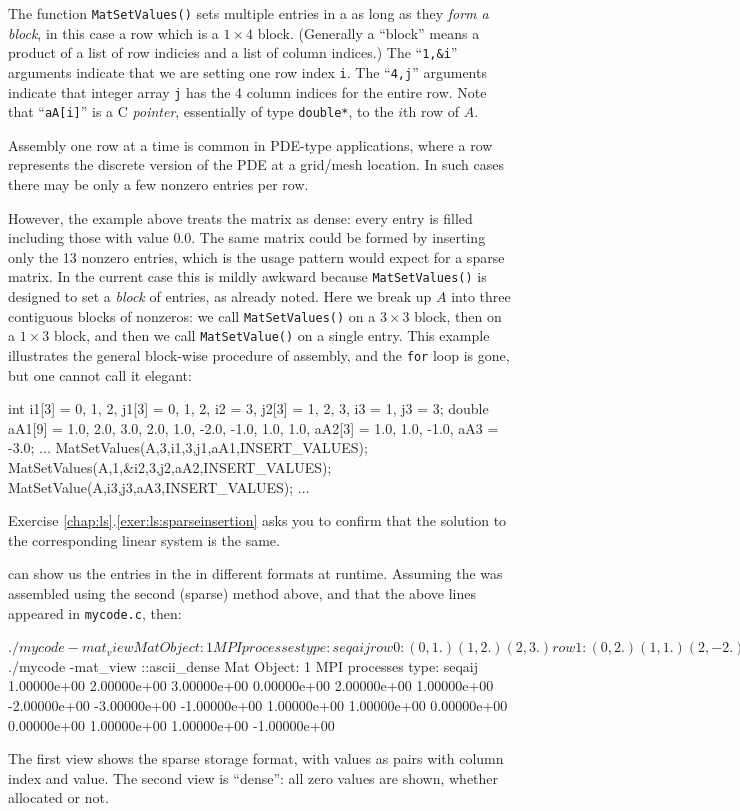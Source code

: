 The function \texttt{MatSetValues()} sets multiple entries in a \pMat as long as they \emph{form a block}, in this case a row which is a $1\times 4$ block.  (Generally a ``block'' means a product of a list of row indicies and a list of column indices.)  The ``\texttt{1,\&i}'' arguments indicate that we are setting one row index \texttt{i}.  The ``\texttt{4,j}'' arguments indicate that integer array \texttt{j} has the 4 column indices for the entire row.  Note that ``\texttt{aA[i]}'' is a C \emph{pointer}, essentially of type \texttt{double*}, to the $i$th row of $A$.

Assembly one row at a time is common in PDE-type applications, where a row represents the discrete version of the PDE at a grid/mesh location.  In such cases there may be only a few nonzero entries per row.

However, the example above treats the matrix as dense: every entry is filled including those with value $0.0$.  The same matrix could be formed by inserting only the 13 nonzero entries, which is the usage pattern would expect for a sparse matrix.  In the current case this is mildly awkward because \texttt{MatSetValues()} is designed to set a \emph{block} of entries, as already noted.  Here we break up $A$ into three contiguous blocks of nonzeros: we call \texttt{MatSetValues()} on a $3\times 3$ block, then on a $1\times 3$ block, and then we call \texttt{MatSetValue()} on a single entry.  This example illustrates the general block-wise procedure of assembly, and the \texttt{for} loop is gone, but one cannot call it elegant:
\begin{code}
int    i1[3] = {0, 1, 2},
       j1[3] = {0, 1, 2},
       i2 = 3,
       j2[3] = {1, 2, 3},
       i3 = 1,
       j3 = 3;
double aA1[9] = { 1.0,  2.0,  3.0,
                  2.0,  1.0, -2.0,
                 -1.0,  1.0,  1.0},
       aA2[3] = { 1.0,  1.0, -1.0},
       aA3 = -3.0;
...
MatSetValues(A,3,i1,3,j1,aA1,INSERT_VALUES);
MatSetValues(A,1,&i2,3,j2,aA2,INSERT_VALUES);
MatSetValue(A,i3,j3,aA3,INSERT_VALUES);
...
\end{code}
Exercise \ref{chap:ls}.\ref{exer:ls:sparseinsertion} asks you to confirm that the solution to the corresponding linear system is the same.  \label{page:ls:sparseinsertion}

\PETSc can show us the entries in the \pMat in different formats at runtime.  Assuming the \pMat was assembled using the second (sparse) method above, and that the above lines appeared in \texttt{mycode.c}, then:
\begin{cline}
$ ./mycode -mat_view
Mat Object: 1 MPI processes
  type: seqaij
row 0: (0, 1.)  (1, 2.)  (2, 3.) 
row 1: (0, 2.)  (1, 1.)  (2, -2.)  (3, -3.) 
row 2: (0, -1.)  (1, 1.)  (2, 1.) 
row 3: (1, 1.)  (2, 1.)  (3, -1.) 
$ ./mycode -mat_view ::ascii_dense
Mat Object: 1 MPI processes
  type: seqaij
 1.00000e+00  2.00000e+00  3.00000e+00  0.00000e+00
 2.00000e+00  1.00000e+00  -2.00000e+00  -3.00000e+00
 -1.00000e+00  1.00000e+00  1.00000e+00  0.00000e+00
 0.00000e+00  1.00000e+00  1.00000e+00  -1.00000e+00
\end{cline}
The first view shows the sparse storage format, with values as pairs with column index and value.  The second view is ``dense'': all zero values are shown, whether allocated or not.

